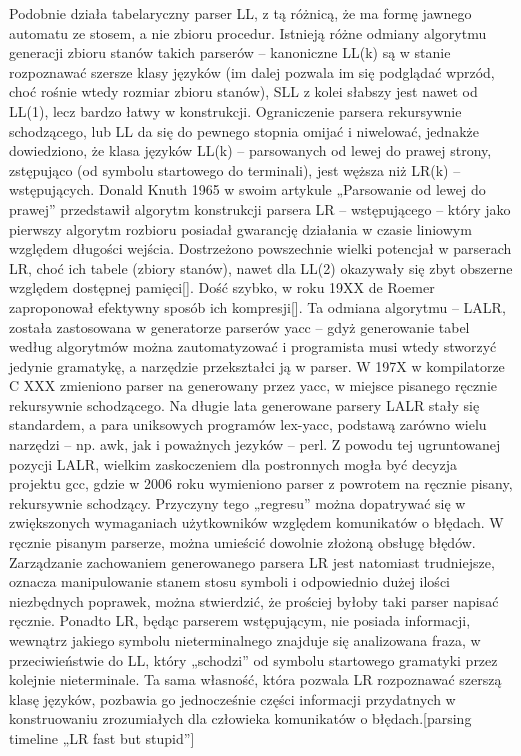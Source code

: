 Podobnie działa tabelaryczny parser LL, z tą różnicą, że ma formę jawnego automatu ze stosem, a nie zbioru procedur. Istnieją różne odmiany algorytmu generacji zbioru stanów takich parserów – kanoniczne LL(k) są w stanie rozpoznawać szersze klasy języków (im dalej pozwala im się podglądać wprzód, choć rośnie wtedy rozmiar zbioru stanów), SLL z kolei słabszy jest nawet od LL(1), lecz bardzo łatwy w konstrukcji.
Ograniczenie parsera rekursywnie schodzącego, lub LL da się do pewnego stopnia omijać i niwelować, jednakże dowiedziono, że klasa języków LL(k) – parsowanych od lewej do prawej strony, zstępująco (od symbolu startowego do terminali), jest węższa niż LR(k) – wstępujących.
Donald Knuth 1965 w swoim artykule „Parsowanie od lewej do prawej” przedstawił algorytm konstrukcji parsera LR – wstępującego – który jako pierwszy algorytm rozbioru posiadał gwarancję działania w czasie liniowym względem długości wejścia. Dostrzeżono powszechnie wielki potencjał w parserach LR,  choć ich tabele (zbiory stanów), nawet dla LL(2) okazywały się zbyt obszerne względem dostępnej pamięci[]. Dość szybko, w roku 19XX de Roemer zaproponował efektywny sposób ich kompresji[]. Ta odmiana algorytmu – LALR, została zastosowana w generatorze parserów yacc – gdyż generowanie tabel według algorytmów można zautomatyzować i programista musi wtedy stworzyć jedynie gramatykę, a narzędzie przekształci ją w parser. W 197X w kompilatorze C XXX zmieniono parser na generowany przez yacc, w miejsce pisanego ręcznie rekursywnie schodzącego. Na długie lata generowane parsery LALR stały się standardem, a para uniksowych programów lex-yacc, podstawą zarówno wielu narzędzi – np. awk, jak i poważnych jezyków – perl.
Z powodu tej ugruntowanej pozycji LALR, wielkim zaskoczeniem dla postronnych mogła być decyzja projektu gcc, gdzie w 2006 roku wymieniono parser z powrotem na ręcznie pisany, rekursywnie schodzący. Przyczyny tego „regresu” można dopatrywać się w zwiększonych wymaganiach użytkowników względem komunikatów o błędach. W ręcznie pisanym parserze, można umieścić dowolnie złożoną obsługę błędów. Zarządzanie zachowaniem generowanego parsera LR jest natomiast trudniejsze, oznacza manipulowanie stanem stosu symboli i odpowiednio dużej ilości niezbędnych poprawek, można stwierdzić, że prościej byłoby taki parser napisać ręcznie. Ponadto LR, będąc parserem wstępującym, nie posiada informacji, wewnątrz jakiego symbolu nieterminalnego znajduje się analizowana fraza, w przeciwieństwie do LL, który „schodzi” od symbolu startowego gramatyki przez kolejnie nieterminale. Ta sama własność, która pozwala LR rozpoznawać szerszą klasę języków, pozbawia go jednocześnie części informacji przydatnych w konstruowaniu zrozumiałych dla człowieka komunikatów o błędach.[parsing timeline „LR fast but stupid”]

